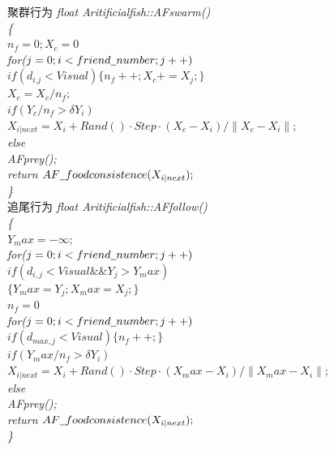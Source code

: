 \documentclass[a4paper, 11pt]{article}
\begin{document}
\begin{section}
\begin{subsection}
		\small{聚群行为}
			\flushleft\scriptsize{\emph{float Aritificial\underline{\hspace{0.5em}}fish::AF\underline{\hspace{0.5em}}swarm() \\ {\{} \\ {\qquad $n_f=0;X_c=0$} \\ {\qquad for($j=0;i<friend\underline{\hspace{0.5em}}number;j++)$} \\ {\qquad\qquad $if(d_{i.j}<Visual) \{ n_f++;X_c+=X_j;\}$} \\ {\qquad $X_c=X_c/n_f;$}\\{\qquad $if (Y_c/n_f>\delta Y_i)$}\\{\qquad\qquad $X_{i|next}=X_i+Rand()·Step·(X_c-X_i)/\lVert X_c-X_i\rVert;$}\\{\qquad else}\\{\qquad\qquad AF\underline{\hspace{0.5em}}prey();}\\{ return $AF\underline{\hspace{0.5em}}foodconsistence(X_{i|next});$} \\{\}} }}\\
		\small{追尾行为}
			\flushleft\scriptsize{\emph{float Aritificial\underline{\hspace{0.5em}}fish::AF\underline{\hspace{0.5em}}follow() \\ {\{} \\ {\qquad $Y_max=-\infty;$} \\ {\qquad for($j=0;i<friend\underline{\hspace{0.5em}}number;j++)$} \\ {\qquad\qquad $if(d_{i,j}<Visual \&\& Y_j>Y_max)$} \\ {\qquad\qquad\qquad $\{ Y_max=Y_j; X_max=X_j; \}$ }\\{\qquad $n_f=0$}\\{\qquad for($j=0;i<friend\underline{\hspace{0.5em}}number;j++)$}\\{\qquad\qquad $if(d_{max,j}<Visual) \{ n_f++;\} $}\\{\qquad $if (Y_max/n_f>\delta Y_i)$}\\{\qquad\qquad $X_{i|next}=X_i+Rand()·Step·(X_max-X_i)/\lVert X_max-X_i\rVert;$}\\{\qquad else}\\{\qquad\qquad AF\underline{\hspace{0.5em}}prey();}\\{ return $AF\underline{\hspace{0.5em}}foodconsistence(X_{i|next});$} \\{\}} }}\\

\end{subsection}
\end{section}
\end{document}
